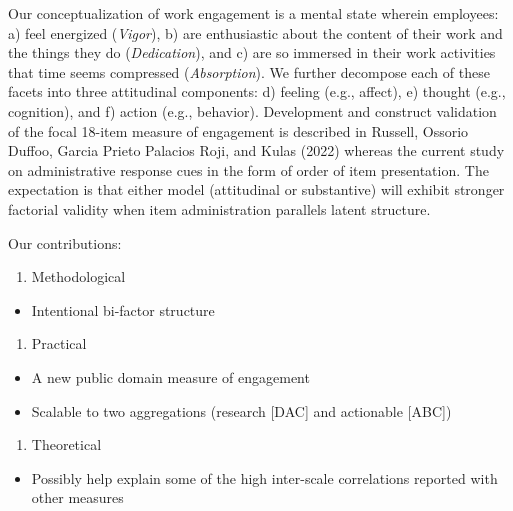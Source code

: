 \documentclass[
  man]{apa6}
\providecommand{\tightlist}{%
  \setlength{\itemsep}{0pt}\setlength{\parskip}{0pt}}
\begin{document}
Our conceptualization of work engagement is a mental state wherein employees: a) feel energized (\emph{Vigor}), b) are enthusiastic about the content of their work and the things they do (\emph{Dedication}), and c) are so immersed in their work activities that time seems compressed (\emph{Absorption}). We further decompose each of these facets into three attitudinal components: d) feeling (e.g., affect), e) thought (e.g., cognition), and f) action (e.g., behavior). Development and construct validation of the focal 18-item measure of engagement is described in Russell, Ossorio Duffoo, Garcia Prieto Palacios Roji, and Kulas (2022) whereas the current study on administrative response cues in the form of order of item presentation. The expectation is that either model (attitudinal or substantive) will exhibit stronger factorial validity when item administration parallels latent structure.

Our contributions:

\begin{enumerate}
\def\labelenumi{\arabic{enumi}.}
\tightlist
\item
  Methodological
\end{enumerate}

\begin{itemize}
\tightlist
\item
  Intentional bi-factor structure
\end{itemize}

\begin{enumerate}
\def\labelenumi{\arabic{enumi}.}
\setcounter{enumi}{1}
\tightlist
\item
  Practical
\end{enumerate}

\begin{itemize}
\tightlist
\item
  A new public domain measure of engagement
\item
  Scalable to two aggregations (research {[}DAC{]} and actionable {[}ABC{]})
\end{itemize}

\begin{enumerate}
\def\labelenumi{\arabic{enumi}.}
\setcounter{enumi}{2}
\tightlist
\item
  Theoretical
\end{enumerate}

\begin{itemize}
\tightlist
\item
  Possibly help explain some of the high inter-scale correlations reported with other measures
\end{itemize}
\end{document}
